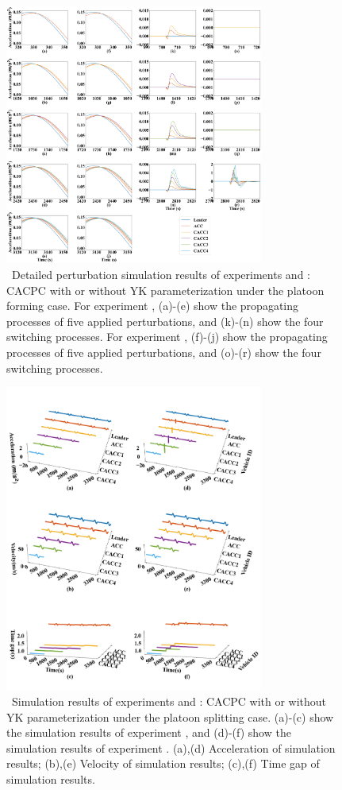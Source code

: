 \documentclass[journal]{IEEEtran}
\begin{document}
\begin{figure}
  \centering
  \includegraphics[width=8.5cm]{figs/form_detail.png}
  \caption{~Detailed perturbation simulation results of experiments \uppercase\expandafter{} and \uppercase\expandafter{}: CACPC with or without YK parameterization under the platoon forming case. For experiment \uppercase\expandafter{}, (a)-(e) show the propagating processes of five applied perturbations, and (k)-(n) show the four switching processes. For experiment \uppercase\expandafter{}, (f)-(j) show the propagating processes of five applied perturbations, and (o)-(r) show the four switching processes.}
  \label{new2}
\end{figure}

\begin{figure}
  \centering
  \includegraphics[width=8.5cm]{figs/c_split.png}
  \caption{~Simulation results of experiments \uppercase\expandafter{} and \uppercase\expandafter{}: CACPC with or without YK parameterization under the platoon splitting case. (a)-(c) show the simulation results of experiment \uppercase\expandafter{}, and (d)-(f) show the simulation results of experiment \uppercase\expandafter{}. (a),(d) Acceleration of simulation results; (b),(e) Velocity of simulation results; (c),(f) Time gap of simulation results.}
  \label{new3}
\end{figure}
\end{document}
